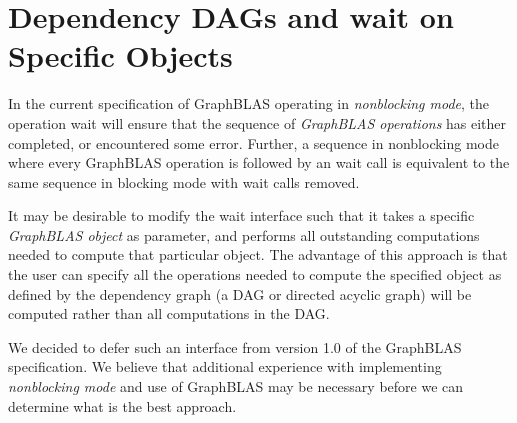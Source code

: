 \section{Dependency DAGs and {\sf wait} on Specific Objects}
\label{Sec:DAG}

In the current specification of GraphBLAS operating in \emph{nonblocking mode}, the 
operation {\sf wait} will ensure that the sequence of \emph{GraphBLAS operations} 
has either completed, or encountered some error. Further, a sequence in nonblocking mode where every GraphBLAS operation is followed by an {\sf wait} call is 
equivalent to the same sequence in blocking mode with {\sf wait} calls removed.

It may be desirable to modify the {\sf wait} interface such that it takes a specific \emph{GraphBLAS object} as parameter, and performs all outstanding computations needed to compute that particular object. The advantage of this approach is that the user can specify all the operations needed to compute the specified object as defined by the dependency graph (a  DAG or directed acyclic graph) will be computed rather than all computations in the DAG.

We decided to defer such an interface from version 1.0 of the GraphBLAS specification. We believe that additional experience with implementing \emph{nonblocking mode} and use of GraphBLAS may be necessary before we can determine what is the best approach.


